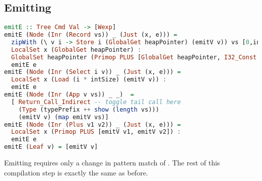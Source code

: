 \subsection{\label{subsection:emit2}Emitting}
\begin{lstlisting}[language=Haskell]
emitE :: Tree Cmd Val -> [Wexp]
emitE (Node (Inr (Record vs)) _ (Just (x, e))) =
  zipWith (\ v i -> Store i (GlobalGet heapPointer) (emitV v)) vs [0,intSize..] ++
  LocalSet x (GlobalGet heapPointer) :
  GlobalSet heapPointer (Primop PLUS [GlobalGet heapPointer, I32_Const (length vs * intSize)]) :
  emitE e
emitE (Node (Inr (Select i v)) _ (Just (x, e))) =
  LocalSet x (Load (i * intSize) (emitV v)) :
  emitE e
emitE (Node (Inr (App v vs)) _ _)  =
  [ Return_Call_Indirect -- toggle tail call here
    (Type (typePrefix ++ show (length vs)))
    (emitV v) (map emitV vs)]
emitE (Node (Inr (Plus v1 v2)) _ (Just (x, e))) =
  LocalSet x (Primop PLUS [emitV v1, emitV v2]) :
  emitE e
emitE (Leaf v) = [emitV v]
\end{lstlisting}

Emitting requires only a change in pattern match of . The rest of this compilation step is exactly the same as before.
